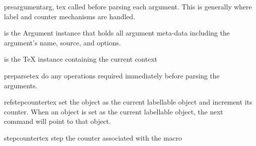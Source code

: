 \begin{methoddesc}[Macro]{preargument}{arg, tex}
called before parsing each argument.  This is generally where label and
counter mechanisms are handled.

 is the Argument instance that holds all argument meta-data
    including the argument's name, source, and options.

 is the TeX instance containing the current context 
\end{methoddesc}

\begin{methoddesc}[Macro]{preparse}{tex}
do any operations required immediately before parsing the arguments.
\end{methoddesc}

\begin{methoddesc}[Macro]{refstepcounter}{tex}
set the object as the current labellable object and increment its counter.
When an object is set as the current labellable object, the next 
 command will point to that object.
\end{methoddesc}

\begin{methoddesc}[Macro]{stepcounter}{tex}
step the counter associated with the macro
\end{methoddesc}
